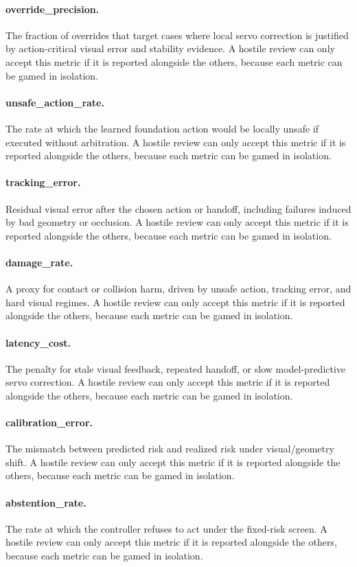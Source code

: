 \documentclass{article}
\begin{document}
\paragraph{override\_precision.} The fraction of overrides that target cases where local servo correction is justified by action-critical visual error and stability evidence. A hostile review can only accept this metric if it is reported alongside the others, because each metric can be gamed in isolation.
\paragraph{unsafe\_action\_rate.} The rate at which the learned foundation action would be locally unsafe if executed without arbitration. A hostile review can only accept this metric if it is reported alongside the others, because each metric can be gamed in isolation.
\paragraph{tracking\_error.} Residual visual error after the chosen action or handoff, including failures induced by bad geometry or occlusion. A hostile review can only accept this metric if it is reported alongside the others, because each metric can be gamed in isolation.
\paragraph{damage\_rate.} A proxy for contact or collision harm, driven by unsafe action, tracking error, and hard visual regimes. A hostile review can only accept this metric if it is reported alongside the others, because each metric can be gamed in isolation.
\paragraph{latency\_cost.} The penalty for stale visual feedback, repeated handoff, or slow model-predictive servo correction. A hostile review can only accept this metric if it is reported alongside the others, because each metric can be gamed in isolation.
\paragraph{calibration\_error.} The mismatch between predicted risk and realized risk under visual/geometry shift. A hostile review can only accept this metric if it is reported alongside the others, because each metric can be gamed in isolation.
\paragraph{abstention\_rate.} The rate at which the controller refuses to act under the fixed-risk screen. A hostile review can only accept this metric if it is reported alongside the others, because each metric can be gamed in isolation.
\end{document}
